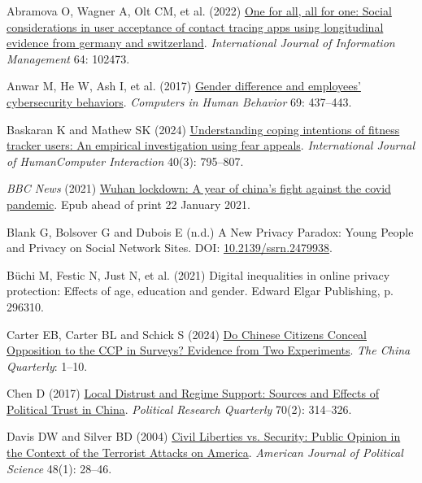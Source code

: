 \documentclass[
  letterpaper,
  DIV=11,
  numbers=noendperiod]{scrartcl}
\newlength{\cslhangindent}
\newenvironment{CSLReferences}[2] %
 {\begin{list}{}{%
  \setlength{\itemindent}{0pt}
  \setlength{\leftmargin}{0pt}
  \setlength{\parsep}{0pt}
  \ifodd #1
   \setlength{\leftmargin}{\cslhangindent}
   \setlength{\itemindent}{-1\cslhangindent}
  \fi
  \setlength{\itemsep}{#2\baselineskip}}}
 {\end{list}}
\begin{document}
\label{refs}
\begin{CSLReferences}{1}{1}
Abramova O, Wagner A, Olt CM, et al. (2022)
\href{https://doi.org/10.1016/j.ijinfomgt.2022.102473}{One for all, all
for one: Social considerations in user acceptance of contact tracing
apps using longitudinal evidence from germany and switzerland}.
\emph{International Journal of Information Management} 64: 102473.

Anwar M, He W, Ash I, et al. (2017)
\href{https://doi.org/10.1016/j.chb.2016.12.040}{Gender difference and
employees' cybersecurity behaviors}. \emph{Computers in Human Behavior}
69: 437--443.

Baskaran K and Mathew SK (2024)
\href{https://doi.org/10.1080/10447318.2022.2124358}{Understanding
coping intentions of fitness tracker users: An empirical investigation
using fear appeals}. \emph{International Journal of
Human{\textendash}Computer Interaction} 40(3): 795--807.

\emph{BBC News} (2021)
\href{https://www.bbc.com/news/world-asia-china-55628488}{Wuhan
lockdown: A year of china's fight against the covid pandemic}. Epub
ahead of print 22 January 2021.

Blank G, Bolsover G and Dubois E (n.d.) A New Privacy Paradox: Young
People and Privacy on Social Network Sites. DOI:
\href{https://doi.org/10.2139/ssrn.2479938}{10.2139/ssrn.2479938}.

Büchi M, Festic N, Just N, et al. (2021) Digital inequalities in online
privacy protection: Effects of age, education and gender. Edward Elgar
Publishing, p. 296310.

Carter EB, Carter BL and Schick S (2024)
\href{https://doi.org/10.1017/S0305741023001819}{Do Chinese Citizens
Conceal Opposition to the CCP in Surveys? Evidence from Two
Experiments}. \emph{The China Quarterly}: 1--10.

Chen D (2017) \href{https://doi.org/10.1177/1065912917691360}{Local
Distrust and Regime Support: Sources and Effects of Political Trust in
China}. \emph{Political Research Quarterly} 70(2): 314--326.

Davis DW and Silver BD (2004)
\href{https://doi.org/10.1111/j.0092-5853.2004.00054.x}{Civil Liberties
vs. Security: Public Opinion in the Context of the Terrorist Attacks on
America}. \emph{American Journal of Political Science} 48(1): 28--46.


\end{CSLReferences}
\end{document}
